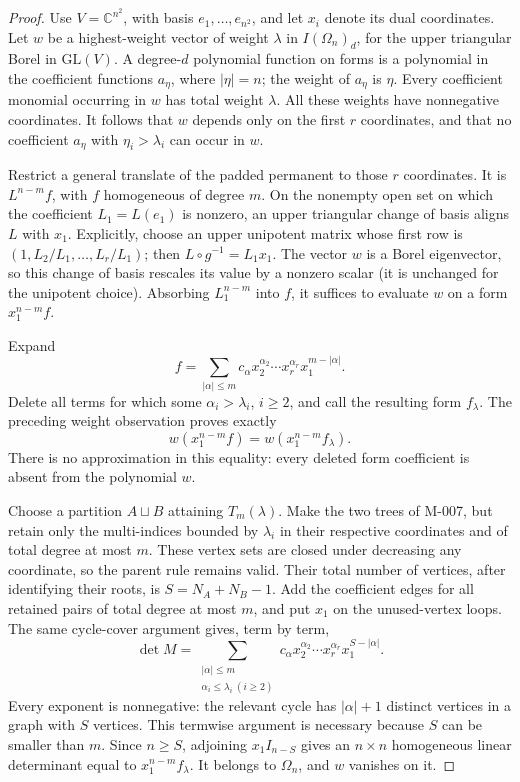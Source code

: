 \begin{proof}
Use \(V=\mathbb C^{n^2}\), with basis \(e_1,\ldots,e_{n^2}\),
and let \(x_i\) denote its dual coordinates. Let \(w\) be a highest-weight
vector of weight \(\lambda\) in \(I(\Omega_n)_d\), for the upper
triangular Borel in \(\mathrm{GL}(V)\). A degree-\(d\) polynomial
function on forms is a polynomial in the coefficient functions
\(a_\eta\), where \(|\eta|=n\); the weight of \(a_\eta\) is
\(\eta\). Every coefficient monomial occurring in \(w\) has total
weight \(\lambda\). All these weights have nonnegative coordinates.
It follows that \(w\) depends only on the first \(r\) coordinates,
and that no coefficient \(a_\eta\) with
\(\eta_i>\lambda_i\) can occur in \(w\).

Restrict a general translate of the padded permanent to those
\(r\) coordinates. It is \(L^{n-m}f\), with \(f\) homogeneous
of degree \(m\). On the nonempty open set on which the coefficient
\(L_1=L(e_1)\) is nonzero, an upper triangular change of basis
aligns \(L\) with \(x_1\). Explicitly, choose an upper unipotent
matrix whose first row is \((1,L_2/L_1,\ldots,L_r/L_1)\);
then \(L\circ g^{-1}=L_1x_1\).
The vector \(w\) is a Borel eigenvector, so this change of basis
rescales its value by a nonzero scalar (it is unchanged for the
unipotent choice). Absorbing \(L_1^{n-m}\) into \(f\), it suffices
to evaluate \(w\) on a form \(x_1^{n-m}f\).

Expand
\[
 f=\sum_{|\alpha|\leq m}
            c_\alpha x_2^{\alpha_2}\cdots x_r^{\alpha_r}
                         x_1^{m-|\alpha|}.
\]
Delete all terms for which some \(\alpha_i>\lambda_i\),
\(i\geq2\), and call the resulting form \(f_\lambda\).
The preceding weight observation proves exactly
\[
       w(x_1^{n-m}f)=w(x_1^{n-m}f_\lambda).
\]
There is no approximation in this equality: every deleted form
coefficient is absent from the polynomial \(w\).

Choose a partition \(A\sqcup B\) attaining \(T_m(\lambda)\).
Make the two trees of M-007, but retain only the multi-indices
bounded by \(\lambda_i\) in their respective coordinates and
of total degree at most \(m\). These vertex sets are closed
under decreasing any coordinate, so the parent rule remains valid.
Their total number of vertices, after identifying their roots, is
\(S=N_A+N_B-1\). Add the coefficient edges for all retained
pairs of total degree at most \(m\), and put \(x_1\) on the
unused-vertex loops. The same cycle-cover argument gives, term by term,
\[
 \det M=\sum_{\substack{|\alpha|\leq m\\
                       \alpha_i\leq\lambda_i\ (i\geq2)}}
                c_\alpha x_2^{\alpha_2}\cdots x_r^{\alpha_r}
                                x_1^{S-|\alpha|}.
\]
Every exponent is nonnegative: the relevant cycle has
\(|\alpha|+1\) distinct vertices in a graph with \(S\) vertices.
This termwise argument is necessary because \(S\) can be smaller
than \(m\). Since \(n\geq S\), adjoining
\(x_1 I_{n-S}\) gives an \(n\times n\) homogeneous linear
determinant equal to \(x_1^{n-m}f_\lambda\).
It belongs to \(\Omega_n\), and \(w\) vanishes on it.


\end{proof}
